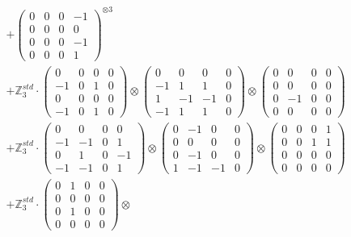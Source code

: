\documentclass{article}
\begin{document}
{\begin{align}
        &+ \label{Rs16-Rc11-Solution-14-c16} \begin{pmatrix} 0 & 0 & 0 & -1 \\ 0 & 0 & 0 & 0 \\ 0 & 0 & 0 & -1 \\ 0 & 0 & 0 & 1 \end{pmatrix}^{\otimes 3} \\
        &+ \label{Rs16-Rc11-Solution-14-c17} \mathbb{Z}_3^{std} \cdot 
            \begin{pmatrix} 0 & 0 & 0 & 0 \\ -1 & 0 & 1 & 0 \\ 0 & 0 & 0 & 0 \\ -1 & 0 & 1 & 0 \end{pmatrix} \otimes 
            \begin{pmatrix} 0 & 0 & 0 & 0 \\ -1 & 1 & 1 & 0 \\ 1 & -1 & -1 & 0 \\ -1 & 1 & 1 & 0 \end{pmatrix} \otimes 
            \begin{pmatrix} 0 & 0 & 0 & 0 \\ 0 & 0 & 0 & 0 \\ 0 & -1 & 0 & 0 \\ 0 & 0 & 0 & 0 \end{pmatrix} \\ 
        &+ \label{Rs16-Rc11-Solution-14-c18} \mathbb{Z}_3^{std} \cdot 
            \begin{pmatrix} 0 & 0 & 0 & 0 \\ -1 & -1 & 0 & 1 \\ 0 & 1 & 0 & -1 \\ -1 & -1 & 0 & 1 \end{pmatrix} \otimes 
            \begin{pmatrix} 0 & -1 & 0 & 0 \\ 0 & 0 & 0 & 0 \\ 0 & -1 & 0 & 0 \\ 1 & -1 & -1 & 0 \end{pmatrix} \otimes 
            \begin{pmatrix} 0 & 0 & 0 & 1 \\ 0 & 0 & 1 & 1 \\ 0 & 0 & 0 & 0 \\ 0 & 0 & 0 & 0 \end{pmatrix} \\ 
        &+ \label{Rs16-Rc11-Solution-14-c19} \mathbb{Z}_3^{std} \cdot 
            \begin{pmatrix} 0 & 1 & 0 & 0 \\ 0 & 0 & 0 & 0 \\ 0 & 1 & 0 & 0 \\ 0 & 0 & 0 & 0 \end{pmatrix} \otimes 

\end{align}}
\end{document}
